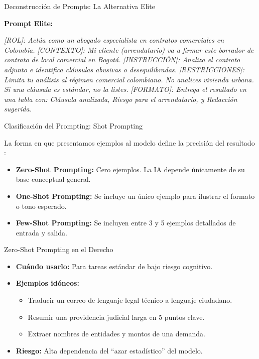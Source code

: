\documentclass[aspectratio=169]{beamer}
\begin{document}
\begin{frame}[fragile]{Deconstrucción de Prompts: La Alternativa Elite}


\textbf{Prompt Elite:}

\textit{[ROL]: Actúa como un abogado especialista en contratos comerciales en Colombia.}
\textit{[CONTEXTO]: Mi cliente (arrendatario) va a firmar este borrador de contrato de local comercial en Bogotá.}
\textit{[INSTRUCCIÓN]: Analiza el contrato adjunto e identifica cláusulas abusivas o desequilibradas.}
\textit{[RESTRICCIONES]: Limita tu análisis al régimen comercial colombiano. No analices vivienda urbana. Si una cláusula es estándar, no la listes.}
\textit{[FORMATO]: Entrega el resultado en una tabla con: Cláusula analizada, Riesgo para el arrendatario, y Redacción sugerida.}


\end{frame}



\begin{frame}[fragile]{Clasificación del Prompting: Shot Prompting}


La forma en que presentamos ejemplos al modelo define la precisión del resultado \cite{murray2024}:

\begin{itemize}
  \item \textbf{Zero-Shot Prompting:} Cero ejemplos. La IA depende únicamente de su base conceptual general.
  \item \textbf{One-Shot Prompting:} Se incluye un único ejemplo para ilustrar el formato o tono esperado.
  \item \textbf{Few-Shot Prompting:} Se incluyen entre 3 y 5 ejemplos detallados de entrada y salida.
\end{itemize}
\end{frame}



\begin{frame}[fragile]{Zero-Shot Prompting en el Derecho}


\begin{itemize}
  \item \textbf{Cuándo usarlo:} Para tareas estándar de bajo riesgo cognitivo.
  \item \textbf{Ejemplos idóneos:}
  \begin{itemize}
    \item Traducir un correo de lenguaje legal técnico a lenguaje ciudadano.
    \item Resumir una providencia judicial larga en 5 puntos clave.
    \item Extraer nombres de entidades y montos de una demanda.
  \end{itemize}
  \item \textbf{Riesgo:} Alta dependencia del ``azar estadístico'' del modelo.
\end{itemize}
\end{frame}
\end{document}

